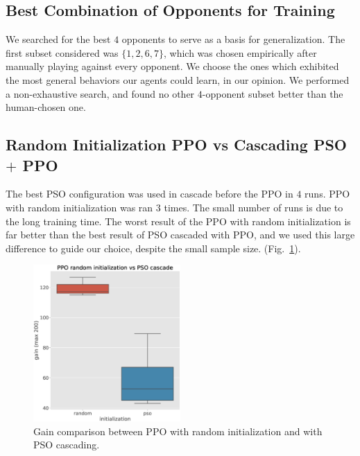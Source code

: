 \documentclass[conference]{IEEEtran}
\begin{document}
    \subsection{Best Combination of Opponents for Training}\label{subsec:best-combination-of-opponents-for-training}
    We searched for the best $4$ opponents to serve as a basis for generalization.
    The first subset considered was $\{1, 2, 6, 7\}$, which was chosen empirically after manually playing against every opponent. We choose the ones which exhibited the most general behaviors our agents could learn, in our opinion. We performed a non-exhaustive search, and found no other $4$-opponent subset better than the human-chosen one.

    \subsection{Random Initialization PPO vs Cascading PSO $+$ PPO}\label{subsec:random-initialization-ppo-vs-pso-cascading-ppo}
    The best PSO configuration was used in cascade before the PPO in $4$ runs.
    PPO with random initialization was ran $3$ times.
    The small number of runs is due to the long training time.
    The worst result of the PPO with random initialization is far better than the best result
    of PSO cascaded with PPO\@, and we used this large difference to guide our choice, despite the small sample size. (Fig.~\ref{fig:random_vs_pso_initialization}).
    \begin{figure}[htbp]
        \centering
        \includegraphics[width=0.5\textwidth]{images/random_vs_pso_initialization.eps}
        \caption{Gain comparison between PPO with random initialization and with PSO cascading.}
        \label{fig:random_vs_pso_initialization}
    \end{figure}
\end{document}
